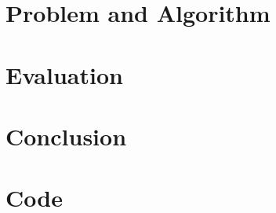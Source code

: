 \documentclass[fyp]{socreport}
\begin{document}
\chapter{Problem and Algorithm}

\chapter{Evaluation}

\chapter{Conclusion}




\appendix
\chapter{Code}

\end{document}
